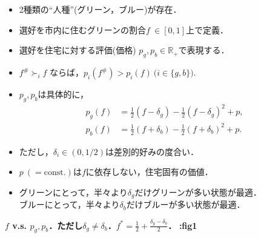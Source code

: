 \documentclass[uplatex,12pt,dvipdfmx,xcolor=svgnames]{beamer}
\begin{document}
\section{\secII}
\begin{frame}[t]{\secII}
	
\begin{itemize}
	\item 2種類の``人種''(グリーン，ブルー)が存在．
	\item 選好を市内に住むグリーンの割合$f\ \in[0, 1]$上で定義．
	\item 選好を住宅に対する評価(価格) $p_g, p_b \in \mathbb{R}_+$で表現する．
	\item $f^{\#} \succ_{i} f$ ならば，$p_i(f^{\#}) > p_i(f)\ \big( i \in \{g, b\} \big).$
	\item $p_g, p_b$は具体的に，
		\begin{align}
			p_g(f) &= \frac{1}{2}(f-\delta_g) -\frac{1}{2}(f-\delta_g)^2 +p,
			\tag{2.1.g} \\
			p_b(f) &= \frac{1}{2}(f+\delta_b) -\frac{1}{2}(f+\delta_b)^2 +p.
			\tag{2.1.b}
		\end{align}
	\item ただし，$\delta_i \in(0, 1/2)$は差別的好みの度合い．
	\item $p\ (=\text{const.})$は$f$に依存しない，住宅固有の価値．
	\item グリーンにとって，半々より$\delta_g$だけグリーンが多い状態が最適．\\
		ブルーにとって，半々より$\delta_b$だけブルーが多い状態が最適．
\end{itemize}


	
	\textbf{$f$ v.s. $p_g, p_b$．ただし$\delta_g \neq \delta_b$．$f^*=\frac{1}{2}+\frac{\delta_g - \delta_b}{2}$．}
	\textbf{:fig1}


\end{frame}
\end{document}
